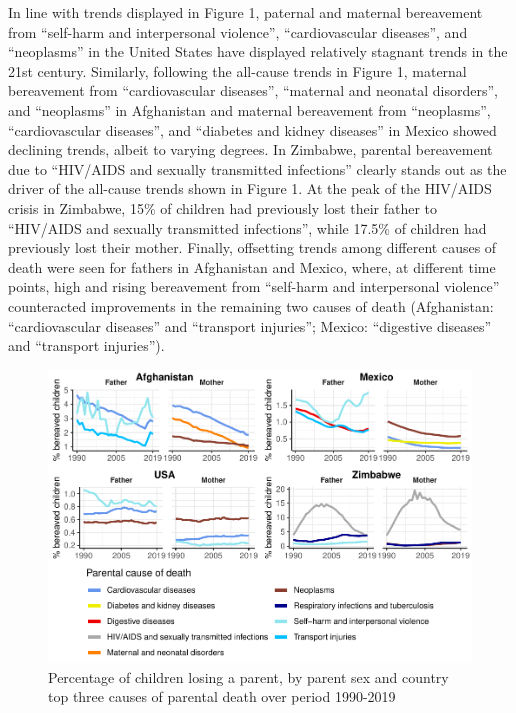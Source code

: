 \documentclass[
  11pt,
  letterpaper,
]{article}
\begin{document}
In line with trends displayed in Figure 1, paternal and maternal bereavement from ``self-harm and interpersonal violence'', ``cardiovascular diseases'', and ``neoplasms'' in the United States have displayed relatively stagnant trends in the 21st century. Similarly, following the all-cause trends in Figure 1, maternal bereavement from ``cardiovascular diseases'', ``maternal and neonatal disorders'', and ``neoplasms'' in Afghanistan and maternal bereavement from ``neoplasms'', ``cardiovascular diseases'', and ``diabetes and kidney diseases'' in Mexico showed declining trends, albeit to varying degrees. In Zimbabwe, parental bereavement due to ``HIV/AIDS and sexually transmitted infections'' clearly stands out as the driver of the all-cause trends shown in Figure 1. At the peak of the HIV/AIDS crisis in Zimbabwe, 15\% of children had previously lost their father to ``HIV/AIDS and sexually transmitted infections'', while 17.5\% of children had previously lost their mother. Finally, offsetting trends among different causes of death were seen for fathers in Afghanistan and Mexico, where, at different time points, high and rising bereavement from ``self-harm and interpersonal violence'' counteracted improvements in the remaining two causes of death (Afghanistan: ``cardiovascular diseases'' and ``transport injuries''; Mexico: ``digestive diseases'' and ``transport injuries'').

\begin{figure}
\centering
\includegraphics{parental_loss_global_paa_ext_abstract_files/figure-latex/perc-ber-top-1.pdf}
\caption{\label{fig:perc-ber-top}Percentage of children losing a parent, by parent sex and country top three causes of parental death over period 1990-2019}
\end{figure}
\end{document}
